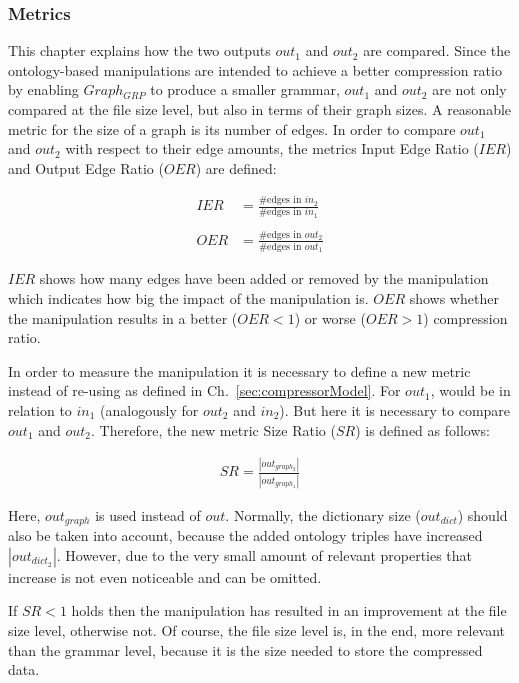 \subsubsection{Metrics}

This chapter explains how the two outputs $out_1$ and $out_2$ are compared. Since the ontology-based manipulations are intended to achieve a better compression ratio by enabling $Graph_{GRP}$ to produce a smaller grammar, $out_1$ and $out_2$ are not only compared at the file size level, but also in terms of their graph sizes. A reasonable metric for the size of a graph is its number of edges. In order to compare $out_1$ and $out_2$ with respect to their edge amounts, the metrics Input Edge Ratio ($IER$) and Output Edge Ratio ($OER$)  are defined: 

\begin{align*}
IER&=\frac {\text{\#edges in } in_2} {\text{\#edges in  } in_1}
\\\\
OER&=\frac {\text{\#edges in } out_2} {\text{\#edges in } out_1}
 \end{align*}
 
$IER$ shows how many edges have been added or removed by the manipulation which indicates how big the impact of the manipulation is. $OER$  shows whether the manipulation results in a better ($OER<1$) or worse ($OER>1$) compression ratio.

In order to measure the manipulation it is necessary to define a new metric instead of re-using  as defined in Ch.~\ref{sec:compressorModel}. For $out_1$,  would be in relation to $in_1$ (analogously for $out_2$ and $in_2$). But here it is necessary to compare $out_1$ and $out_2$. Therefore, the new metric Size Ratio ($SR$) is defined as follows:

\begin{align*} 
SR=\frac {|out_{graph_2}|} {|out_{graph_1}|}
\end{align*}

Here, $out_{graph}$ is used instead of $out$. Normally, the dictionary size ($out_{dict}$) should also be taken into account, because the added ontology triples have increased $|out_{dict_2}|$. However, due to the very small amount of relevant properties that increase is not even noticeable and can be omitted. 

If $SR<1$ holds then the manipulation has resulted in an improvement at the file size level, otherwise not. Of course, the file size level is, in the end, more relevant than the grammar level, because it is the size needed to store the compressed data.


